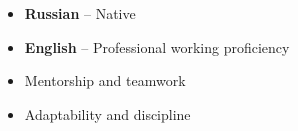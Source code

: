 
\twocolumnsection
{
\vspace{1em}
\begin{itemize}
   \item{} {\textbf{Russian}} -- Native
   \item{} {\textbf{English}} -- Professional working proficiency
\end{itemize}}
{
\vspace{1em}
\begin{itemize}
   \item Mentorship and teamwork
   \item Adaptability and discipline
\end{itemize}}
